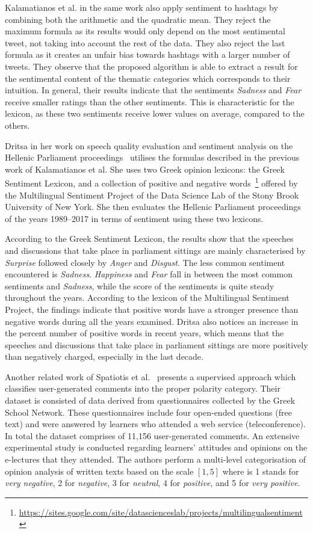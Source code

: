 Kalamatianos et al. in the same work also apply sentiment to hashtags
by combining both the arithmetic and the quadratic mean.
They reject the maximum formula as its results would only depend
on the most sentimental tweet, not taking into account the rest of the data.
They also reject the last formula as it creates an unfair bias towards hashtags
with a larger number of tweets.
They observe that the proposed algorithm is able to extract a result
for the sentimental content of the thematic categories
which corresponds to their intuition.
In general, their results indicate that the sentiments \emph{Sadness}
and \emph{Fear} receive smaller ratings than the other sentiments.
This is characteristic for the lexicon,
as these two sentiments receive lower values on average, compared to the others.

Dritsa in her work on speech quality evaluation and sentiment analysis
on the Hellenic Parliament proceedings~\cite{Dri18} utilises the formulas
described in the previous work of Kalamatianos et al.
She uses two Greek opinion lexicons: the Greek Sentiment Lexicon,
and a collection of positive and negative words~\footnote{\url{https://sites.google.com/site/datascienceslab/projects/multilingualsentiment}}
offered by the Multilingual Sentiment Project of the Data Science Lab
of the Stony Brook University of New York.
She then evaluates the Hellenic Parliament proceedings of the years 1989--2017
in terms of sentiment using these two lexicons.

According to the Greek Sentiment Lexicon,
the results show that the speeches and discussions
that take place in parliament sittings are mainly characterised
by \emph{Surprise} followed closely by \emph{Anger} and \emph{Disgust}.
The less common sentiment encountered is \emph{Sadness}.
\emph{Happiness} and \emph{Fear} fall in
between the most common sentiments and \emph{Sadness},
while the score of the sentiments is quite steady throughout the years.
According to the lexicon of the Multilingual Sentiment Project,
the findings indicate that positive words have a stronger presence
than negative words during all the years examined.
Dritsa also notices an increase in the percent number of positive words
in recent years,
which means that the speeches and discussions that take place in parliament sittings
are more positively than negatively charged, especially in the last decade.

Another related work of Spatiotis et al.~\cite{SMPP16} presents a supervised approach
which classifies user-generated comments into the proper polarity category.
Their dataset is consisted of data derived from questionnaires
collected by the Greek School Network.
These questionnaires include four open-ended questions (free text)
and were answered by learners who attended a web service (teleconference).
In total the dataset comprises of 11,156 user-generated comments.
An extensive experimental study is conducted regarding learners' attitudes and opinions
on the e-lectures that they attended.
The authors perform a multi-level categorisation of opinion analysis of written texts
based on the scale $[1,5]$ where is 1 stands for \emph{very negative},
2 for \emph{negative}, 3 for \emph{neutral}, 4 for \emph{positive},
and 5 for \emph{very positive}.

